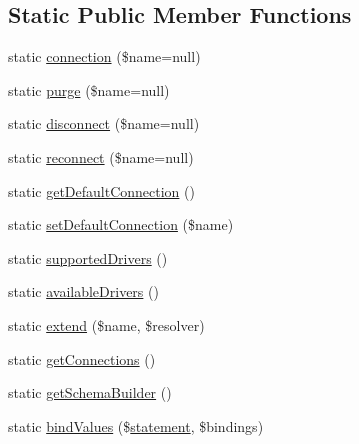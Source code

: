 \subsection*{Static Public Member Functions}
\begin{DoxyCompactItemize}
\item 
static \mbox{\hyperlink{class_illuminate_1_1_support_1_1_facades_1_1_d_b_af4c07501009e8ba9afb48a1521386349}{connection}} (\$name=null)
\item 
static \mbox{\hyperlink{class_illuminate_1_1_support_1_1_facades_1_1_d_b_ad182e19d6511300709463429b3161e46}{purge}} (\$name=null)
\item 
static \mbox{\hyperlink{class_illuminate_1_1_support_1_1_facades_1_1_d_b_a88b1d08f43661642873618c64b985d1d}{disconnect}} (\$name=null)
\item 
static \mbox{\hyperlink{class_illuminate_1_1_support_1_1_facades_1_1_d_b_a45a46775e77c12f572548c56dd24b596}{reconnect}} (\$name=null)
\item 
static \mbox{\hyperlink{class_illuminate_1_1_support_1_1_facades_1_1_d_b_a9447726af67bae33284f04df631d3ca5}{get\+Default\+Connection}} ()
\item 
static \mbox{\hyperlink{class_illuminate_1_1_support_1_1_facades_1_1_d_b_a99a188fb854611692a62504154ea6a1c}{set\+Default\+Connection}} (\$name)
\item 
static \mbox{\hyperlink{class_illuminate_1_1_support_1_1_facades_1_1_d_b_abcff492f4356880fa4e19317721715a6}{supported\+Drivers}} ()
\item 
static \mbox{\hyperlink{class_illuminate_1_1_support_1_1_facades_1_1_d_b_aa0ab684056ac5ba028a0c66e9a5c05b6}{available\+Drivers}} ()
\item 
static \mbox{\hyperlink{class_illuminate_1_1_support_1_1_facades_1_1_d_b_af20022f9089afcf294af9c0a6929940f}{extend}} (\$name, \$resolver)
\item 
static \mbox{\hyperlink{class_illuminate_1_1_support_1_1_facades_1_1_d_b_ad8ceace824e4fa7e3f0ab8f1af294f10}{get\+Connections}} ()
\item 
static \mbox{\hyperlink{class_illuminate_1_1_support_1_1_facades_1_1_d_b_a8788e832eb3fcb8bb10a7a0a9eaa8580}{get\+Schema\+Builder}} ()
\item 
static \mbox{\hyperlink{class_illuminate_1_1_support_1_1_facades_1_1_d_b_a470a17871255d477ada27e71eb6d0da9}{bind\+Values}} (\$\mbox{\hyperlink{class_illuminate_1_1_support_1_1_facades_1_1_d_b_abe9fe35abfd29aa9bccba94a269c9f25}{statement}}, \$bindings)
\item 

\end{DoxyCompactItemize}
